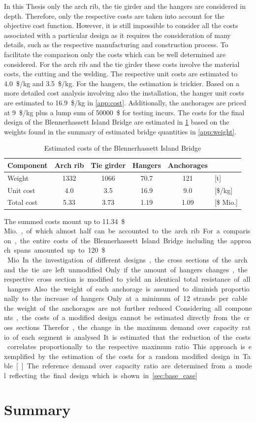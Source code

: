 In this Thesis only the arch rib, the tie girder and the hangers are considered in depth. Therefore, only the respective costs are taken into account for the objective cost function. However, it is still impossible to consider all the costs associated with a particular design as it requires the consideration of many details, such as the respective manufacturing and construction process. To facilitate the comparison only the costs which can be well determined are considered. For the arch rib and the tie girder these costs involve the material costs, the cutting and the welding. The respective unit costs are estimated to \SI{4.0}{\$/kg} and \SI{3.5}{\$/kg}. For the hangers, the estimation is trickier. Based on a more detailed cost analysis involving also the installation, the hanger unit costs are estimated to \SI{16.9}{\$/kg} in \cref{app:cost}. Additionally, the anchorages are priced at \SI{9}{\$/kg} plus a lump sum of \SI{50000}{\$} for testing incurs. The costs for the final design of the Blennerhassett Island Bridge are estimated in \cref{tab:cost_example} based on the weights found in the summary of estimated bridge quantities in \cref{app:weight}.

\begin{table}[H]
    \centering
    \caption{Estimated costs of the Blennerhassett Island Bridge}
    \label{tab:cost_example}
    \begin{tabular}{lccccl}
    \toprule
    Component & Arch rib & Tie girder & Hangers & Anchorages &  \\ \midrule
    Weight & \SI{1332}{} & \SI{1066}{} & \SI{70.7}{} & \SI{121}{} & {[}t{]} \\
    Unit cost & \SI{4.0}{} & \SI{3.5}{} & \SI{16.9}{} & \SI{9.0}{} & {[}\$/kg{]} \\
    Total cost & \SI{5.33}{} & \SI{3.73}{} & \SI{1.19}{} & \SI{1.09}{} & [\$ Mio.] \\ \bottomrule
    \end{tabular}
\end{table}

The summed costs mount up to \SI{11.34}{\$\,Mio.}, of which almost half can be accounted to the arch rib. For a comparison, the entire costs of the Blennerhassett Island Bridge including the approach spans amounted up to \SI{120}{\$\,Mio}. In the investigation of different designs, the cross sections of the arch and the tie are left unmodified. Only if the amount of hangers changes, the respective cross section is modified to yield an identical total resistance of all hangers. Also the weight of each anchorage is assumed to diminish proportionally to the increase of hangers. Only at a minimum of 12 strands per cable the weight of the anchorages are not further reduced. Considering all components, the costs of a modified design cannot be estimated directly from the cross sections. Therefor, the change in the maximum demand over capacity ratio of each segment is analysed. It is estimated that the reduction of the costs correlates proportionally to the respective maximum ratio. This approach is exemplified by the estimation of the costs for a random modified design in Table []. The reference demand over capacity ratio are determined from a model reflecting the final design which is shown in \ref{sec:base_case}
\newpage
\section{Summary}